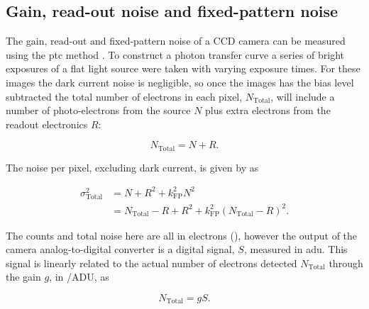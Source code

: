 \begin{colsection}
\begin{colsection}
\end{colsection}

\newpage
\subsection{Gain, read-out noise and fixed-pattern noise}
\label{sec:ptc}
\begin{colsection}

The gain, read-out and fixed-pattern noise of a CCD camera can be measured using the \gls{ptc} method \citep{CCDs, PTC}. To construct a photon transfer curve a series of bright exposures of a flat light source were taken with varying exposure times. For these images the dark current noise is negligible, so once the images has the bias level subtracted the total number of electrons in each pixel, $N_\text{Total}$, will include a number of photo-electrons from the source $N$ plus extra electrons from the readout electronics $R$:

\begin{equation}
    N_\text{Total} = N + R.
    \label{eq:total_count}
\end{equation}

The noise per pixel, excluding dark current, is given by  as

\begin{equation}
    \begin{split}
        \sigma_\text{Total}^2 & = N + R^2 + k_\text{FP}^2 N^2 \\
                              & = N_\text{Total} - R + R^2 + k_\text{FP}^2{(N_\text{Total} - R)}^2.
    \end{split}
    \label{eq:ptc_noise1}
\end{equation}

The counts and total noise here are all in electrons (\elec), however the output of the camera analog-to-digital converter is a digital signal, $S$, measured in \gls{adu}. This signal is linearly related to the actual number of electrons detected $N_\text{Total}$ through the gain $g$, in \elec/ADU, as

\begin{equation}
    N_\text{Total} = g S.
    \label{eq:gain}
\end{equation}


\end{colsection}
\end{colsection}
